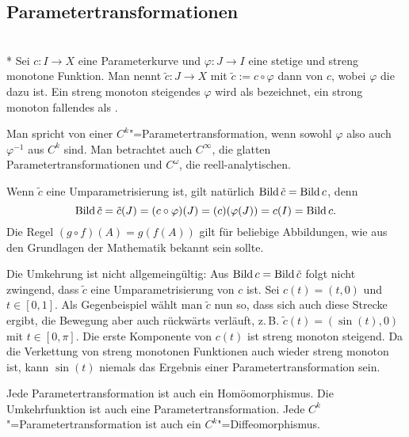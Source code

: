 \pagebreak
\subsection{Parametertransformationen}

\begin{definition}\mbox{}\\*
Sei $c\colon I\to X$ eine Parameterkurve und $\varphi\colon J\to I$
eine stetige und streng monotone Funktion. Man nennt
$\tilde c\colon J\to X$ mit $\tilde c:=c\circ\varphi$ dann
 von $c$, wobei $\varphi$ die
 dazu ist. Ein streng monoton steigendes
$\varphi$ wird als  bezeichnet,
ein strong monoton fallendes als .

Man spricht von einer $C^k$"=Parametertransformation, wenn sowohl
$\varphi$ also auch $\varphi^{-1}$ aus $C^k$ sind. Man betrachtet
auch $C^\infty$, die glatten Parametertransformationen und
$C^\omega$, die reell-analytischen.
\end{definition}

\noindent
Wenn $\tilde c$ eine Umparametrisierung ist, gilt natürlich
$\operatorname{Bild}\tilde c=\operatorname{Bild} c$, denn
\begin{equation}
\operatorname{Bild}\tilde c = \tilde c(J)
= (c\circ\varphi)(J) = (c)(\varphi(J))
= c(I) = \operatorname{Bild} c.
\end{equation}
Die Regel $(g\circ f)(A)=g(f(A))$ gilt für beliebige Abbildungen,
wie aus den Grundlagen der Mathematik bekannt sein sollte.

Die Umkehrung ist nicht allgemeingültig: Aus
$\operatorname{Bild} c=\operatorname{Bild}\tilde c$ folgt nicht zwingend, dass
$\tilde c$ eine Umparametrisierung von $c$ ist. Sei
$c(t)=(t,0)$ und $t\in[0,1]$. Als Gegenbeispiel wählt man
$\tilde c$ nun so, dass sich auch diese Strecke ergibt, die
Bewegung aber auch rückwärts verläuft, z.\,B. $\tilde c(t)=(\sin(t),0)$
mit $t\in[0,\pi]$. Die erste Komponente von $c(t)$ ist streng
monoton steigend. Da die Verkettung von streng monotonen Funktionen
auch wieder streng monoton ist, kann $\sin(t)$ niemals das Ergebnis
einer Parametertransformation sein.

\begin{corollary}
Jede Parametertransformation ist auch ein
Homöomorphismus. Die Umkehrfunktion ist auch eine
Parametertransformation. Jede $C^k$"=Parametertransformation
ist auch ein $C^k$"=Diffeomorphismus.
\end{corollary}

